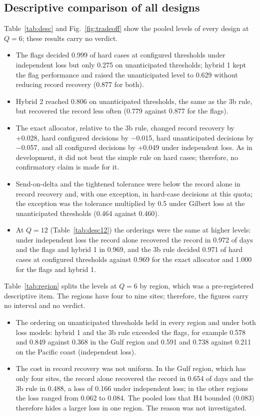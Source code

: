 \subsection{Descriptive comparison of all designs}
\label{sec:desc}
Table~\ref{tab:desc} and Fig.~\ref{fig:tradeoff} show the pooled levels of every design at $Q = 6$; these results carry no verdict.
\begin{itemize}
  \item The flags decided 0.999 of hard cases at configured thresholds under independent loss but only 0.275 on unanticipated thresholds; hybrid 1 kept the flag performance and raised the unanticipated level to 0.629 without reducing record recovery (0.877 for both).
  \item Hybrid 2 reached 0.806 on unanticipated thresholds, the same as the 3b rule, but recovered the record less often (0.779 against 0.877 for the flags).
  \item The exact allocator, relative to the 3b rule, changed record recovery by +0.028, hard configured decisions by $-$0.015, hard unanticipated decisions by $-$0.057, and all configured decisions by +0.049 under independent loss. As in development, it did not beat the simple rule on hard cases; therefore, no confirmatory claim is made for it.
  \item Send-on-delta and the tightened tolerance were below the record alone in record recovery and, with one exception, in hard-case decisions at this quota; the exception was the tolerance multiplied by 0.5 under Gilbert loss at the unanticipated thresholds (0.464 against 0.460).
  \item At $Q = 12$ (Table~\ref{tab:desc12}) the orderings were the same at higher levels: under independent loss the record alone recovered the record in 0.972 of days and the flags and hybrid 1 in 0.969, and the 3b rule decided 0.971 of hard cases at configured thresholds against 0.969 for the exact allocator and 1.000 for the flags and hybrid 1.
\end{itemize}

Table~\ref{tab:region} splits the levels at $Q = 6$ by region, which was a pre-registered descriptive item. The regions have four to nine sites; therefore, the figures carry no interval and no verdict.
\begin{itemize}
  \item The ordering on unanticipated thresholds held in every region and under both loss models: hybrid 1 and the 3b rule exceeded the flags, for example 0.578 and 0.849 against 0.368 in the Gulf region and 0.591 and 0.738 against 0.211 on the Pacific coast (independent loss).
  \item The cost in record recovery was not uniform. In the Gulf region, which has only four sites, the record alone recovered the record in 0.654 of days and the 3b rule in 0.488, a loss of 0.166 under independent loss; in the other regions the loss ranged from 0.062 to 0.084. The pooled loss that H4 bounded (0.083) therefore hides a larger loss in one region. The reason was not investigated.
\end{itemize}

